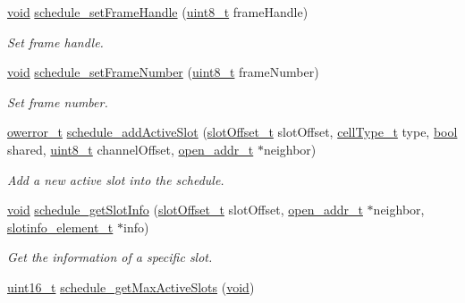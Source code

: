 \begin{DoxyCompactItemize}
\hyperlink{usb__devapi_8h_afabf60e7f57651d6d595a02c75f07cd0}{void} \hyperlink{group___schedule_ga2584242bf9622f92c42e59337a38a364}{schedule\+\_\+set\+Frame\+Handle} (\hyperlink{_p_e___types_8h_aba7bc1797add20fe3efdf37ced1182c5}{uint8\+\_\+t} frame\+Handle)
\begin{DoxyCompactList}\small\item\em Set frame handle. \end{DoxyCompactList}\item 
\hyperlink{usb__devapi_8h_afabf60e7f57651d6d595a02c75f07cd0}{void} \hyperlink{group___schedule_ga8b2f6512ece5caf24247579f28c1a77d}{schedule\+\_\+set\+Frame\+Number} (\hyperlink{_p_e___types_8h_aba7bc1797add20fe3efdf37ced1182c5}{uint8\+\_\+t} frame\+Number)
\begin{DoxyCompactList}\small\item\em Set frame number. \end{DoxyCompactList}\item 
\hyperlink{opendefs_8h_af20b7c3ed9d2ba19e56a309ad9314803}{owerror\+\_\+t} \hyperlink{group___schedule_ga00825b0f7040c67065d65aadde478241}{schedule\+\_\+add\+Active\+Slot} (\hyperlink{group___schedule_ga30a663860a70d8c9db2c3a8e66f544fc}{slot\+Offset\+\_\+t} slot\+Offset, \hyperlink{group___schedule_gad8490d4fdf8cef27f7e5fa6a37046a3d}{cell\+Type\+\_\+t} type, \hyperlink{_p_e___types_8h_a97a80ca1602ebf2303258971a2c938e2}{bool} shared, \hyperlink{_p_e___types_8h_aba7bc1797add20fe3efdf37ced1182c5}{uint8\+\_\+t} channel\+Offset, \hyperlink{structopen__addr__t}{open\+\_\+addr\+\_\+t} $\ast$neighbor)
\begin{DoxyCompactList}\small\item\em Add a new active slot into the schedule. \end{DoxyCompactList}\item 
\hyperlink{usb__devapi_8h_afabf60e7f57651d6d595a02c75f07cd0}{void} \hyperlink{group___schedule_ga5420055f63ffdbafbd782de6afd7dcbd}{schedule\+\_\+get\+Slot\+Info} (\hyperlink{group___schedule_ga30a663860a70d8c9db2c3a8e66f544fc}{slot\+Offset\+\_\+t} slot\+Offset, \hyperlink{structopen__addr__t}{open\+\_\+addr\+\_\+t} $\ast$neighbor, \hyperlink{structslotinfo__element__t}{slotinfo\+\_\+element\+\_\+t} $\ast$info)
\begin{DoxyCompactList}\small\item\em Get the information of a specific slot. \end{DoxyCompactList}\item 
\hyperlink{_p_e___types_8h_a1f1825b69244eb3ad2c7165ddc99c956}{uint16\+\_\+t} \hyperlink{group___schedule_gaa535aa16066ce3a127d6d52ba9e00e4d}{schedule\+\_\+get\+Max\+Active\+Slots} (\hyperlink{usb__devapi_8h_afabf60e7f57651d6d595a02c75f07cd0}{void})

\end{DoxyCompactItemize}
